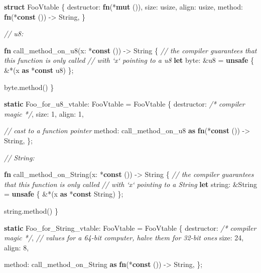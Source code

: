 \documentclass[a4paper,]{book}
\newenvironment{Shaded}{\begin{snugshade}}{\end{snugshade}}
\newcommand{\KeywordTok}[1]{\textcolor[rgb]{0.13,0.29,0.53}{\textbf{{#1}}}}
\newcommand{\DataTypeTok}[1]{\textcolor[rgb]{0.13,0.29,0.53}{{#1}}}
\newcommand{\DecValTok}[1]{\textcolor[rgb]{0.00,0.00,0.81}{{#1}}}
\newcommand{\CommentTok}[1]{\textcolor[rgb]{0.56,0.35,0.01}{\textit{{#1}}}}
\newcommand{\NormalTok}[1]{{#1}}
\begin{document}
\begin{Shaded}
\begin{Highlighting}[]
\KeywordTok{struct} \NormalTok{FooVtable \{}
    \NormalTok{destructor: }\KeywordTok{fn}\NormalTok{(*}\KeywordTok{mut} \NormalTok{()),}
    \NormalTok{size: }\DataTypeTok{usize}\NormalTok{,}
    \NormalTok{align: }\DataTypeTok{usize}\NormalTok{,}
    \NormalTok{method: }\KeywordTok{fn}\NormalTok{(*}\KeywordTok{const} \NormalTok{()) -> }\DataTypeTok{String}\NormalTok{,}
\NormalTok{\}}

\CommentTok{// u8:}

\KeywordTok{fn} \NormalTok{call_method_on_u8(x: *}\KeywordTok{const} \NormalTok{()) -> }\DataTypeTok{String} \NormalTok{\{}
    \CommentTok{// the compiler guarantees that this function is only called}
    \CommentTok{// with `x` pointing to a u8}
    \KeywordTok{let} \NormalTok{byte: &}\DataTypeTok{u8} \NormalTok{= }\KeywordTok{unsafe} \NormalTok{\{ &*(x }\KeywordTok{as} \NormalTok{*}\KeywordTok{const} \DataTypeTok{u8}\NormalTok{) \};}

    \NormalTok{byte.method()}
\NormalTok{\}}

\KeywordTok{static} \NormalTok{Foo_for_u8_vtable: FooVtable = FooVtable \{}
    \NormalTok{destructor: }\CommentTok{/* compiler magic */}\NormalTok{,}
    \NormalTok{size: }\DecValTok{1}\NormalTok{,}
    \NormalTok{align: }\DecValTok{1}\NormalTok{,}

    \CommentTok{// cast to a function pointer}
    \NormalTok{method: call_method_on_u8 }\KeywordTok{as} \KeywordTok{fn}\NormalTok{(*}\KeywordTok{const} \NormalTok{()) -> }\DataTypeTok{String}\NormalTok{,}
\NormalTok{\};}


\CommentTok{// String:}

\KeywordTok{fn} \NormalTok{call_method_on_String(x: *}\KeywordTok{const} \NormalTok{()) -> }\DataTypeTok{String} \NormalTok{\{}
    \CommentTok{// the compiler guarantees that this function is only called}
    \CommentTok{// with `x` pointing to a String}
    \KeywordTok{let} \NormalTok{string: &}\DataTypeTok{String} \NormalTok{= }\KeywordTok{unsafe} \NormalTok{\{ &*(x }\KeywordTok{as} \NormalTok{*}\KeywordTok{const} \DataTypeTok{String}\NormalTok{) \};}

    \NormalTok{string.method()}
\NormalTok{\}}

\KeywordTok{static} \NormalTok{Foo_for_String_vtable: FooVtable = FooVtable \{}
    \NormalTok{destructor: }\CommentTok{/* compiler magic */}\NormalTok{,}
    \CommentTok{// values for a 64-bit computer, halve them for 32-bit ones}
    \NormalTok{size: }\DecValTok{24}\NormalTok{,}
    \NormalTok{align: }\DecValTok{8}\NormalTok{,}

    \NormalTok{method: call_method_on_String }\KeywordTok{as} \KeywordTok{fn}\NormalTok{(*}\KeywordTok{const} \NormalTok{()) -> }\DataTypeTok{String}\NormalTok{,}
\NormalTok{\};}
\end{Highlighting}
\end{Shaded}
\end{document}
